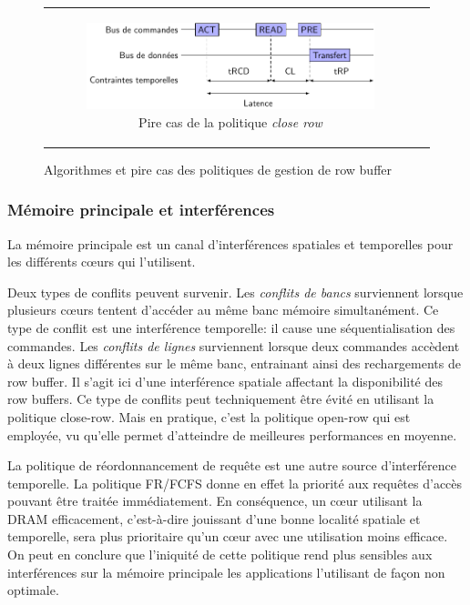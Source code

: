 \begin{figure}[!h]
\begin{tabular} {c c}
		\begin{subfigure}[t]{0,5\linewidth}
			\includegraphics[width=\linewidth]{graphics/figures/close_row_policy_wcet2.pdf}
			\caption{\label{fig:closed_row_algo}Pire cas de la politique \emph{close row}}
		\end{subfigure} \\
	\end{tabular}

	\caption{\label{open_close_row}Algorithmes et pire cas des politiques de gestion de row buffer}
\end{figure}

\subsubsection{Mémoire principale et interférences}

La mémoire principale est un canal d'interférences spatiales et temporelles pour les différents cœurs qui l'utilisent.

Deux types de conflits peuvent survenir.
Les \emph{conflits de bancs} surviennent lorsque plusieurs cœurs tentent d'accéder au même banc mémoire simultanément.
Ce type de conflit est une interférence temporelle: il cause une séquentialisation des commandes.
Les \emph{conflits de lignes} surviennent lorsque deux commandes accèdent à deux lignes différentes sur le même banc, entrainant ainsi des rechargements de row buffer.
Il s'agit ici d'une interférence spatiale affectant la disponibilité des row buffers.
Ce type de conflits peut techniquement être évité en utilisant la politique close-row. 
Mais en pratique, c'est la politique open-row qui est employée, vu qu'elle permet d'atteindre de meilleures performances en moyenne.

La politique de réordonnancement de requête est une autre source d'interférence temporelle.
La politique FR/FCFS donne en effet la priorité aux requêtes d'accès pouvant être traitée immédiatement.
En conséquence, un cœur utilisant la DRAM efficacement, c'est-à-dire jouissant d'une bonne localité spatiale et temporelle, sera plus prioritaire qu'un cœur avec une utilisation moins efficace.
On peut en conclure que l'iniquité de cette politique rend plus sensibles aux interférences sur la mémoire principale les applications l'utilisant de façon non optimale.

